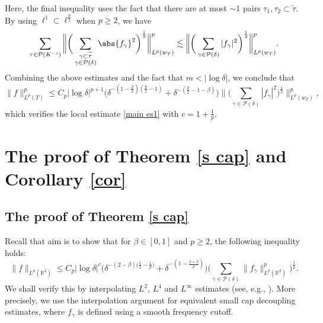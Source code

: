\documentclass[reqno,centertags,11pt,a4paper]{amsart}
\begin{document}
Here, the final inequality uses the fact that there are at most $\sim 1$ pairs $\tau_1,\tau_2 \subset \widetilde{\tau}$. By using $\ell^1 \subset \ell^{\frac{p}{2}}$ when $p\geq 2$, we have
\begin{align*}
\sum_{\tau \in \mathcal{P}(K^{-i})} \bigg\| \bigg( \sum_{\substack{\gamma \subset \widetilde{\tau} \\ \gamma \in \mathcal{P}(\delta)}} \abs{f_\gamma}^2 \bigg)^{\frac{1}{2}} \bigg\|_{L^p(w_T)}^p \lesssim \bigg\| \bigg( \sum_{\gamma \in \mathcal{P}(\delta)} |f_\gamma|^2 \bigg)^{\frac{1}{2}} \bigg\|_{L^p(w_T)}^p.
\end{align*}
Combining the above estimates and the fact that $m < |\log\delta|$, we conclude that
\begin{equation*}
\|f\|_{L^p(T)}^p
\leq C_p |\log\delta|^{p+1} \bigg( \delta^{-\left(1 - \frac{\beta}{2}\right)\left(\frac{p}{2} - 1\right)} + \delta^{-\left(\frac{p}{2} - 1 - \beta\right)} \bigg) \bigg\| \bigg( \sum_{\gamma \in \mathcal{P}(\delta)} |f_\gamma|^2 \bigg)^{\frac{1}{2}} \bigg\|_{L^p(w_T)}^p,
\end{equation*}
which verifies the local estimate \eqref{main es1} with $c=1+\frac{1}{p}$.

\section{The proof of Theorem \ref{s cap} and Corollary \ref{cor}}\label{S3}
\subsection{The proof of Theorem \ref{s cap}}
Recall that aim is to show that for $\beta\in[0,1]$ and $p\geq2$, the following inequality holds:
\begin{equation}
    \|f\|_{L^p(\mathbb{R}^2)}\leq C_p|\log\delta|^{c}\bigg(\delta^{-(2-\beta)\bigl(\frac{1}{2}-\frac{1}{p}\bigr)}+\delta^{-(1-\frac{2+\beta}{p})}\bigg)\bigg(\sum_{\gamma\in\mathcal{P}(\delta)}\|f_\gamma\|_{L^p(\mathbb{R}^2)}^p\bigg)^{\frac{1}{p}}.
\end{equation}
We shall verify this by interpolating $L^2,\, L^4$ and $L^\infty$ estimates (see, e.g., \cite[Remark 3.4]{Lee20}). More precisely, we use the interpolation argument for equivalent small cap decoupling estimates, where $f_\gamma$ is defined using a smooth frequency cutoff.
\end{document}
